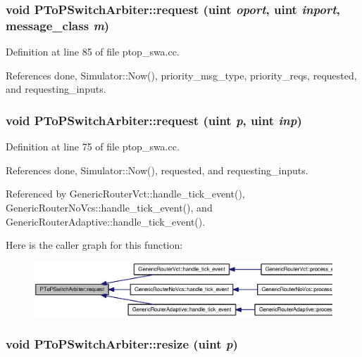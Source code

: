 \subsubsection[{request}]{\setlength{\rightskip}{0pt plus 5cm}void PToPSwitchArbiter::request ({\bf uint} {\em oport}, \/  {\bf uint} {\em inport}, \/  {\bf message\_\-class} {\em m})}\label{classPToPSwitchArbiter_9cab6f94b19bb1ce2ec114d8570e5a07}




Definition at line 85 of file ptop\_\-swa.cc.

References done, Simulator::Now(), priority\_\-msg\_\-type, priority\_\-reqs, requested, and requesting\_\-inputs.
\subsubsection[{request}]{\setlength{\rightskip}{0pt plus 5cm}void PToPSwitchArbiter::request ({\bf uint} {\em p}, \/  {\bf uint} {\em inp})}\label{classPToPSwitchArbiter_34e8394265869ee076610c67e4cf5de7}




Definition at line 75 of file ptop\_\-swa.cc.

References done, Simulator::Now(), requested, and requesting\_\-inputs.

Referenced by GenericRouterVct::handle\_\-tick\_\-event(), GenericRouterNoVcs::handle\_\-tick\_\-event(), and GenericRouterAdaptive::handle\_\-tick\_\-event().

Here is the caller graph for this function:\nopagebreak
\begin{figure}[H]
\begin{center}
\leavevmode
\includegraphics[width=320pt]{classPToPSwitchArbiter_34e8394265869ee076610c67e4cf5de7_icgraph}
\end{center}
\end{figure}
\subsubsection[{resize}]{\setlength{\rightskip}{0pt plus 5cm}void PToPSwitchArbiter::resize ({\bf uint} {\em p})}\label{classPToPSwitchArbiter_73fb7254a91aeeb209fa3225f09b1847}




